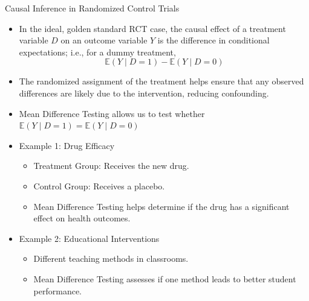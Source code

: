 \documentclass[notes,10pt, aspectratio=169]{beamer}
\begin{document}
\begin{frame}{Causal Inference in Randomized Control Trials}
\begin{itemize}
    \item In the ideal, golden standard RCT case, the causal effect of a treatment variable $D$ on an outcome variable $Y$ is the difference in conditional expectations; i.e., for a dummy treatment,
    \begin{equation*}
        \mathbb{E}(Y\mid D=1)-\mathbb{E}(Y\mid D=0)
    \end{equation*}
    \item The randomized assignment of the treatment helps ensure that any observed differences are likely due to the intervention, reducing confounding.
    \item Mean Difference Testing allows us to test whether $\mathbb{E}(Y\mid D=1)= \mathbb{E}(Y\mid D=0)$
    \item Example 1: Drug Efficacy
        \begin{itemize}
            \item Treatment Group: Receives the new drug.
            \item Control Group: Receives a placebo.
            \item Mean Difference Testing helps determine if the drug has a significant effect on health outcomes.
        \end{itemize}
    \item Example 2: Educational Interventions
        \begin{itemize}
            \item Different teaching methods in classrooms.
            \item Mean Difference Testing assesses if one method leads to better student performance.
        \end{itemize}
\end{itemize}
\end{frame}
\end{document}
